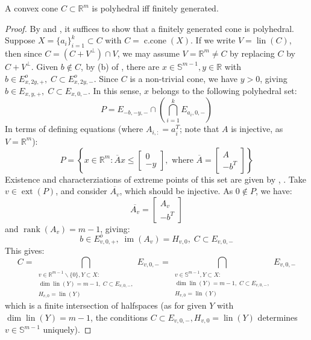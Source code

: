 \begin{prop}\label{prop:017-Minkowski-Weyl-Theorem}
	A convex cone $C\subset \mathbb{R}^m$ is polyhedral iff finitely generated.
\end{prop}
\begin{proof}
	By  and , it suffices to show that a finitely generated cone is polyhedral. Suppose $X=\{a_i\}_{i=1}^{k}\subset C$ with $C=\operatorname{c.cone}(X)$. If we write $V=\operatorname{lin}(C)$, then since $C=(C+V^\perp)\cap V$,	we may assume $V=\mathbb{R}^m\neq C$ by replacing $C$ by $C+V^\perp$. Given $b\notin C$, by (b) of , there are $x\in \mathbb{S}^{m-1},y\in \mathbb{R}$ with $b\in E_{x,2y,+}^o,\; C\subset E_{x,2y,-}^o$.	Since $C$ is a non-trivial cone, we have $y>0$, giving $b\in E_{x,y,+},\; C\subset E_{x,0,-}$. In this sense, $x$ belongs to the following polyhedral set:
	\[
		P = E_{-b,-y,-}\cap\left(\bigcap_{i=1}^k E_{a_i,0,-}\right)
	\]
	In terms of defining equations (where $A_{i,:}=a_i^T$; note that $A$ is injective, as $V=\mathbb{R}^m$):
	\[
		P=
		\left\{x\in \mathbb{R}^m:\overline{A}x\leq
		\left[
			\begin{array}{r}
				0 \\\hline
				-y
			\end{array}
			\right]
		,\text{ where }
		\overline{A}=\left[
			\begin{array}{r}
				A \\\hline
				-b^T
			\end{array}
			\right]
		\right\}
	\]
	Existence and characterziations of extreme points of this set are given by , . Take $v\in \operatorname{ext}(P)$, and consider $\overline{A_v}$, which should be injective. As $0\notin P$, we have:
	\[
		\overline{A_v}=
		\left[
			\begin{array}{r}
				A_v \\\hline
				-b^T
			\end{array}
			\right]
	\]
	and $\operatorname{rank}(A_v)=m-1$, giving:
	\[
		b\in E^o_{v,0,+},\; \operatorname{im}(A_v)=H_{v,0},\; C\subset E_{v,0,-}
	\]
	This gives:
	\[
		C = \bigcap_{\substack{
				v\in \mathbb{R}^{m-1}\smallsetminus\{0\},Y\subset X:\\
				\dim \operatorname{lin}(Y)=m-1,\;C\subset E_{v,0,-},\\
				H_{v,0}=\operatorname{lin}(Y)
			}
		}E_{v,0,-}=
		\bigcap_{\substack{
				v\in \mathbb{S}^{m-1},Y\subset X:\\
				\dim \operatorname{lin}(Y)=m-1,\;C\subset E_{v,0,-},\\
				H_{v,0}=\operatorname{lin}(Y)
			}
		}E_{v,0,-}
	\]
	which is a finite intersection of halfspaces (as for given $Y$ with $\operatorname{dim}\operatorname{lin}(Y)=m-1$, the conditions $C\subset E_{v,0,-},H_{v,0}=\operatorname{lin}(Y)$ determines $v\in \mathbb{S}^{m-1}$ uniquely).
\end{proof}

